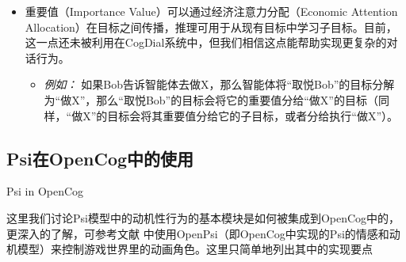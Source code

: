 \begin{itemize}
\item 重要值（Importance Value）可以通过经济注意力分配（Economic Attention Allocation）\cite{EGI2}在目标之间传播，推理可用于从现有目标中学习子目标。目前，这一点还未被利用在CogDial系统中，但我们相信这点能帮助实现更复杂的对话行为。
\begin{itemize}
\item {\it 例如：} 如果Bob告诉智能体去做X，那么智能体将“取悦Bob”的目标分解为“做X”，那么“取悦Bob”的目标会将它的重要值分给“做X”的目标（同样，“做X”的目标会将其重要值分给它的子目标，或者分给执行“做X”）。
\end{itemize}
\end{itemize}

\subsection{Psi在OpenCog中的使用}{Psi in OpenCog}

这里我们讨论Psi模型中的动机性行为的基本模块是如何被集成到OpenCog中的，更深入的了解，可参考文献 \cite{Zhenhua2011}中使用OpenPsi（即OpenCog中实现的Psi的情感和动机模型）来控制游戏世界里的动画角色。这里只简单地列出其中的实现要点


